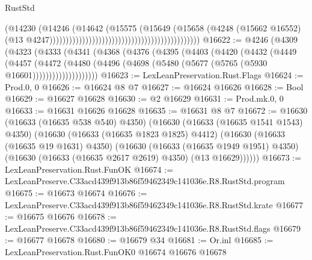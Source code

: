 \begin{lexlean}{RustStd}
\begin{coremodule}
                                                                                (@14230
                                                                                  (@14246
                                                                                    (@14642
                                                                                      (@15575
                                                                                        (@15649
                                                                                          (@15658
                                                                                            (@4248
                                                                                              (@15662
                                                                                                @16552)
                                                                                              (@13
                                                                                                @4247))))))))))))))))))))))))))))))))))))))))))))))
@16622 := @4246
    (@4309
      (@4323
        (@4333
          (@4341
            (@4368
              (@4376
                (@4395
                  (@4403
                    (@4420
                      (@4432
                        (@4449
                          (@4457
                            (@4472
                              (@4480
                                (@4496 (@4698 (@5480 (@5677 (@5765 (@5930 @16601))))))))))))))))))))
@16623 := LexLeanPreservation.Rust.Flags
@16624 := Prod.{0, 0}
@16626 := @16624 @8 @7
@16627 := @16624 @16626
@16628 := Bool
@16629 := @16627 @16628
@16630 := @2 @16629
@16631 := Prod.mk.{0, 0}
@16633 := @16631 @16626 @16628
@16635 := @16631 @8 @7
@16672 := @16630
    (@16633 (@16635 @538 @540) @4350)
    (@16630
      (@16633 (@16635 @1541 @1543) @4350)
      (@16630
        (@16633 (@16635 @1823 @1825) @4412)
        (@16630
          (@16633 (@16635 @19 @1631) @4350)
          (@16630
            (@16633 (@16635 @1949 @1951) @4350)
            (@16630 (@16633 (@16635 @2617 @2619) @4350) (@13 @16629))))))
@16673 := LexLeanPreservation.Rust.FunOK
@16674 := LexLeanPreserve.C33acd439f913b86f59462349c141036e.R8.RustStd.program
@16675 := @16673 @16674
@16676 := LexLeanPreserve.C33acd439f913b86f59462349c141036e.R8.RustStd.krate
@16677 := @16675 @16676
@16678 := LexLeanPreserve.C33acd439f913b86f59462349c141036e.R8.RustStd.flags
@16679 := @16677 @16678
@16680 := @16679 @34
@16681 := Or.inl
@16685 := LexLeanPreservation.Rust.FunOK0 @16674 @16676 @16678

\end{coremodule}
\end{lexlean}
